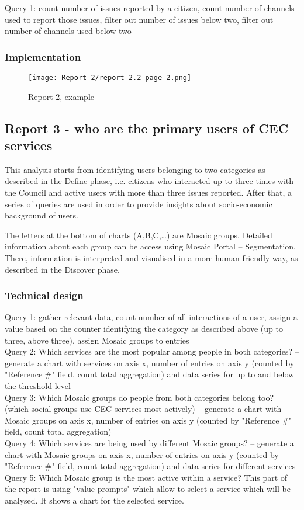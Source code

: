 Query 1: count number of issues reported by a citizen, count number of channels used to report those issues, filter out number of issues below two, filter out number of channels used below two
			
			\subsubsection{Implementation}

\begin{figure}[hp]
\centering
     \texttt{[image: Report 2/report 2.2 page 2.png]}
      \caption{Report 2, example}
       \label{normal_case}
\end{figure}
			
		\subsection{Report 3 - who are the primary users of CEC services}
		
This analysis starts from identifying users belonging to two categories as described in the Define phase, i.e. citizens who interacted up to three times with the Council and active users with more than three issues reported. After that, a series of queries are used in order to provide insights about socio-economic background of users.

The letters at the bottom of charts (A,B,C,…) are Mosaic groups. Detailed information about each group can be access using Mosaic Portal – Segmentation. There, information is interpreted and visualised in a more human friendly way, as described in the Discover phase.

			\subsubsection{Technical design}
			
Query 1: gather relevant data, count number of all interactions of a user, assign a value based on the counter identifying the category as described above (up to three, above three), assign Mosaic groups to entries\\
Query 2: Which services are the most popular among people in both categories? – generate a chart with services on axis x, number of entries on axis y (counted by "Reference \#" field, count total aggregation) and data series for up to and below the threshold level\\
Query 3: Which Mosaic groups do people from both categories belong too? (which social groups use CEC services most actively) – generate a chart with Mosaic groups on axis x, number of entries on axis y (counted by "Reference \#" field, count total aggregation)\\
Query 4: Which services are being used by different Mosaic groups? – generate a chart with Mosaic groups on axis x, number of entries on axis y (counted by "Reference \#" field, count total aggregation) and data series for different services\\
Query 5: Which Mosaic group is the most active within a service? This part of the report is using "value prompts" which allow to select a service which will be analysed. It shows a chart for the selected service.
			
